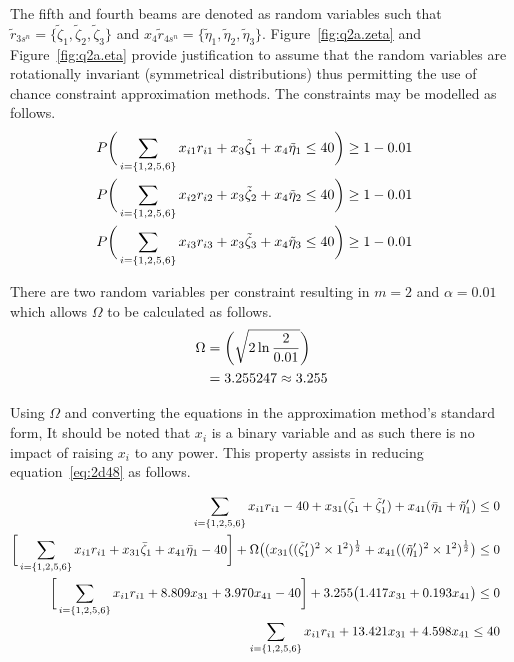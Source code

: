 \documentclass[a4paper,11pt]{article}
\begin{document}
\vspace{12pt}

The fifth and fourth beams are denoted as random variables such that $\tilde{r}_{3s^n} = \{\tilde{\zeta}_1,\tilde{\zeta}_2,\tilde{\zeta}_3\}$ and $x_4\tilde{r}_{4s^n} = \{\tilde{\eta}_1,\tilde{\eta}_2,\tilde{\eta}_3\}$. Figure~\ref{fig:q2a.zeta} and Figure~\ref{fig:q2a.eta} provide justification to assume that the random variables are rotationally invariant (symmetrical distributions) thus permitting the use of chance constraint approximation methods. The constraints may be modelled as follows.
\begin{align}
\label{eq:2d48}
	P\bigg{(}\sum_{i =\{1,2,5,6\}}x_{i1}r_{i1} +x_{3}\tilde{\zeta}_1+ x_{4}\tilde{\eta}_1\leq 40 \bigg{)} \geq 1-0.01&& \\
\label{eq:2d49}
	P\bigg{(}\sum_{i =\{1,2,5,6\}}x_{i2}r_{i2} +x_{3}\tilde{\zeta}_2+ x_{4}\tilde{\eta}_2\leq 40 \bigg{)} \geq 1-0.01&& \\
\label{eq:2d50}
	P\bigg{(}\sum_{i =\{1,2,5,6\}}x_{i3}r_{i3} +x_{3}\tilde{\zeta}_3+ x_{4}\tilde{\eta}_3\leq 40 \bigg{)} \geq 1-0.01&&
\end{align}


There are two random variables per constraint resulting in $m=2$ and $\alpha = 0.01$ which allows $\Omega$ to be calculated as follows.
\begin{align}
	\Omega &= \bigg{(} \sqrt{2 \ln \frac{2}{0.01}} \bigg{)}  \\
			&=3.255247 \approx 3.255
\end{align}


Using $\Omega$ and converting the equations in the approximation method's standard form,  It should be noted that $x_i$ is a binary variable and as such there is no impact of raising $x_i$ to any power. This property assists in reducing equation~\ref{eq:2d48} as follows.

\begin{align}
\sum_{i =\{1,2,5,6\}}x_{i1}r_{i1} -40+x_{31}(\bar{\zeta}_1+\tilde{\zeta}_1^\prime)+ x_{41}(\bar{\eta}_1+\tilde{\eta}_1^\prime)\leq 0 && \\
\bigg{[}\sum_{i =\{1,2,5,6\}}x_{i1}r_{i1} + x_{31}\bar{\zeta}_1+ x_{41}\bar{\eta}_1 -40\bigg{]} +\Omega \big{(}(x_{31}((\tilde{\zeta}_1^\prime)^2\times 1^2)^\frac{1}{2} +x_{41}((\tilde{\eta}_1^\prime)^2\times 1^2)^\frac{1}{2}\big{)}\leq 0 && \\ %
\bigg{[}\sum_{i =\{1,2,5,6\}}x_{i1}r_{i1} + 8.809x_{31}+ 3.970x_{41} -40\bigg{]} +3.255 \big{(}1.417x_{31} + 0.193x_{41}\big{)}\leq 0 && \\ %
\sum_{i =\{1,2,5,6\}}x_{i1}r_{i1} + 13.421x_{31} + 4.598x_{41} \leq 40 && %
\end{align}
\end{document}

